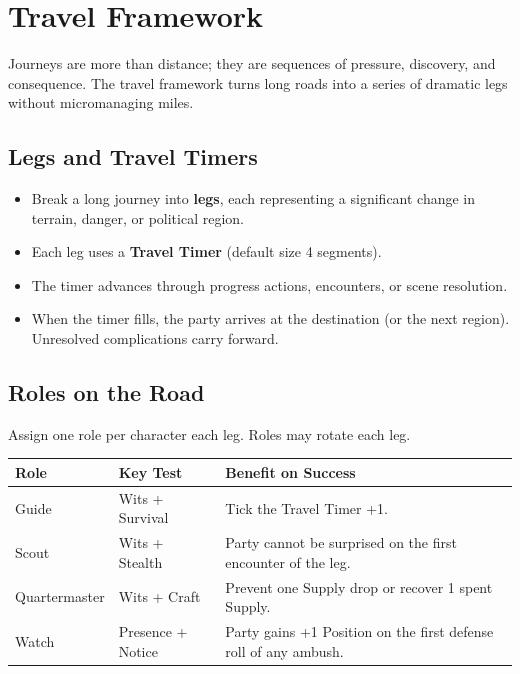 
\section{Travel Framework}

Journeys are more than distance; they are sequences of pressure, discovery, and consequence. The travel framework turns long roads into a series of dramatic legs without micromanaging miles.

\subsection{Legs and Travel Timers}

\begin{itemize}
  \item Break a long journey into \textbf{legs}, each representing a significant change in terrain, danger, or political region.
  \item Each leg uses a \textbf{Travel Timer } (default size 4 segments).
  \item The timer advances through progress actions, encounters, or scene resolution.
  \item When the timer fills, the party arrives at the destination (or the next region). Unresolved complications carry forward.
\end{itemize}

\subsection{Roles on the Road}

Assign one role per character each leg. Roles may rotate each leg.

\begin{tabular}{@{}lp{3cm}p{7cm}@{}}
\toprule
\textbf{Role} & \textbf{Key Test} & \textbf{Benefit on Success} \\
\midrule
Guide & Wits + Survival & Tick the Travel Timer +1. \\
Scout & Wits + Stealth & Party cannot be surprised on the first encounter of the leg. \\
Quartermaster & Wits + Craft & Prevent one Supply drop or recover 1 spent Supply. \\
Watch & Presence + Notice & Party gains +1 Position on the first defense roll of any ambush. \\
\bottomrule
\end{tabular}


